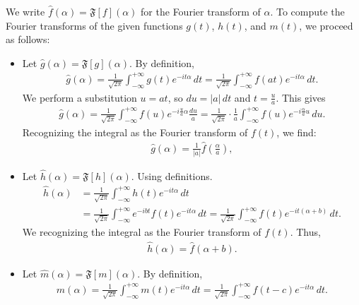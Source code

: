 \documentclass[11pt]{article}
\begin{document}
\begin{solution}
We write \( {\hat f}(\alpha) = \mathfrak{F}[f](\alpha) \) for the Fourier transform of $\alpha$. 
To compute the Fourier transforms of the given functions \( g(t) \), \( h(t) \), and \( m(t) \), we proceed as follows:
\begin{itemize}
\item 
Let \( {\hat g}(\alpha) = \mathfrak{F}[g](\alpha) \). By definition,
\begin{gather*}
    {\hat g}(\alpha) 
    = 
    \frac{1}{\sqrt{2\pi}} \int_{-\infty}^{+\infty} g(t) e^{-it\alpha} \, dt
    =
    \frac{1}{\sqrt{2\pi}} \int_{-\infty}^{+\infty} f(at) e^{-it\alpha} \, dt.
\end{gather*}
We perform a substitution \( u = at \), so \( du = |a| \, dt \) and \( t = \frac{u}{a} \). This gives
\begin{gather*}
    {\hat g}(\alpha) 
    = 
    \frac{1}{\sqrt{2\pi}} \int_{-\infty}^{+\infty} f(u) e^{-i \frac{u}{a} \alpha} \frac{du}{a}
    =
    \frac{1}{\sqrt{2\pi}} \cdot \frac{1}{a} \int_{-\infty}^{+\infty} f(u) e^{-i \frac{\alpha}{a} u} \, du.
\end{gather*}
Recognizing the integral as the Fourier transform of \( f(t) \), we find:
\begin{gather*}
    {\hat g}(\alpha) = \frac{1}{|a|} {\hat f}\left(\frac{\alpha}{a}\right),
\end{gather*}
\item 
Let \( {\hat h}(\alpha) = \mathfrak{F}[h](\alpha) \). Using definitions. 
\begin{align*}
    {\hat h}(\alpha) 
    &
    = 
    \frac{1}{\sqrt{2\pi}} \int_{-\infty}^{+\infty} h(t) e^{-it\alpha} \, dt
    \\&
    =
    \frac{1}{\sqrt{2\pi}} \int_{-\infty}^{+\infty} e^{-ibt} f(t) e^{-it\alpha} \, dt
    =
    \frac{1}{\sqrt{2\pi}} \int_{-\infty}^{+\infty} f(t) e^{-it(\alpha+b)} \, dt.
\end{align*}
We recognizing the integral as the Fourier transform of \( f(t) \). Thus, 
\begin{gather*}
    {\hat h}(\alpha) = {\hat f}(\alpha + b).
\end{gather*}
\item 
Let \( {\hat m}(\alpha) = \mathfrak{F}[m](\alpha) \). By definition,
\begin{gather*}
    {\hat m}(\alpha) 
    = 
    \frac{1}{\sqrt{2\pi}} \int_{-\infty}^{+\infty} m(t) e^{-it\alpha} \, dt
    =
    \frac{1}{\sqrt{2\pi}} \int_{-\infty}^{+\infty} f(t - c) e^{-it\alpha} \, dt.

\end{gather*}
\end{itemize}
\end{solution}
\end{document}

